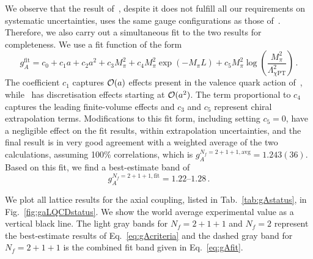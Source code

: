 We observe that the result of~\cite{Berkowitz:2017gql}, despite it does
not fulfill all our requirements on systematic uncertainties, uses the same 
gauge configurations as those of~\cite{Bhattacharya:2016zcn}.
%
Therefore, we also carry out a simultaneous fit to the two results for
completeness.
%
We use a fit function of the form
\begin{equation}
g_A^{\mathrm{fit}} 
= 
c_0 + 
c_1a + 
c_2a^2 + 
c_3M_\pi^2 + 
c_4M_\pi^2 \exp(-M_\pi L) +
c_5M_\pi^2 \log\left(\frac{M_\pi^2}{\Lambda_{\chi \mathrm{PT}}^2}\right)\,.
\end{equation}
%
The coefficient $c_1$ captures ${\cal O}(a)$ effects present in the valence 
quark action of~\cite{Bhattacharya:2016zcn}, while~\cite{Berkowitz:2017gql} 
has discretisation effects starting at ${\cal O}(a^2)$. 
%
The term proportional to $c_4$ captures the leading finite-volume effects and 
$c_3$ and $c_5$ represent chiral extrapolation terms. 
%
Modifications to this fit form, including  setting $c_5=0$, have a negligible 
effect on the fit results, within extrapolation uncertainties, and the final 
result is in very good agreement with a weighted average of the two 
calculations, assuming 100\% correlations, which is 
$g_A^{N_f=2+1+1,\mathrm{avg}} = 1.243(36)$. 
%
Based on this fit, we find a best-estimate band of
\begin{equation}\label{eq:gAfit}
g_A^{N_f=2+1+1,\mathrm{fit}} = \numrange{1.22}{1.28}\,.
\end{equation}

We plot all lattice results for the axial coupling, listed in 
Tab.~\ref{tab:gAstatus}, in Fig.~\ref{fig:gaLQCDstatus}. 
%
We show the world average experimental value as a vertical black line. 
%
The light gray bands for $N_f=2+1+1$ and $N_f=2$ represent the best-estimate 
results of Eq.~\eqref{eq:gAcriteria} and the dashed gray band for
$N_f=2+1+1$ is the combined fit band given in Eq.~\eqref{eq:gAfit}. 


